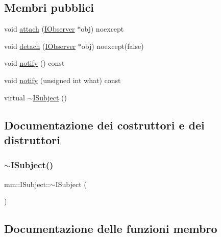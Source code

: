 \subsection*{Membri pubblici}
\begin{DoxyCompactItemize}
\item 
void \mbox{\hyperlink{classmm_1_1_i_subject_a76069d8db0c9c3d543154b0c2ce23bc9}{attach}} (\mbox{\hyperlink{classmm_1_1_i_observer}{I\+Observer}} $\ast$obj) noexcept
\item 
void \mbox{\hyperlink{classmm_1_1_i_subject_a64be1c0b2ad7ee4631a5270dedb7aa88}{detach}} (\mbox{\hyperlink{classmm_1_1_i_observer}{I\+Observer}} $\ast$obj) noexcept(false)
\item 
void \mbox{\hyperlink{classmm_1_1_i_subject_ad693fe5eb99bc20bc6d70f30bdf1140d}{notify}} () const
\item 
void \mbox{\hyperlink{classmm_1_1_i_subject_a6c77bad76084018ccb79106390d97117}{notify}} (unsigned int what) const
\item 
virtual \mbox{\hyperlink{classmm_1_1_i_subject_a37235a8b8ef83116c7351c56e17f7f57}{$\sim$\+I\+Subject}} ()
\end{DoxyCompactItemize}


\subsection{Documentazione dei costruttori e dei distruttori}
\mbox{\label{classmm_1_1_i_subject_a37235a8b8ef83116c7351c56e17f7f57}} 
\subsubsection{\texorpdfstring{$\sim$\+I\+Subject()}{~ISubject()}}
{\footnotesize\ttfamily mm\+::\+I\+Subject\+::$\sim$\+I\+Subject (\begin{DoxyParamCaption}{ }\end{DoxyParamCaption})\hspace{0.3cm}{\ttfamily [virtual]}}



\subsection{Documentazione delle funzioni membro}
\mbox{\label{classmm_1_1_i_subject_a76069d8db0c9c3d543154b0c2ce23bc9}} 
